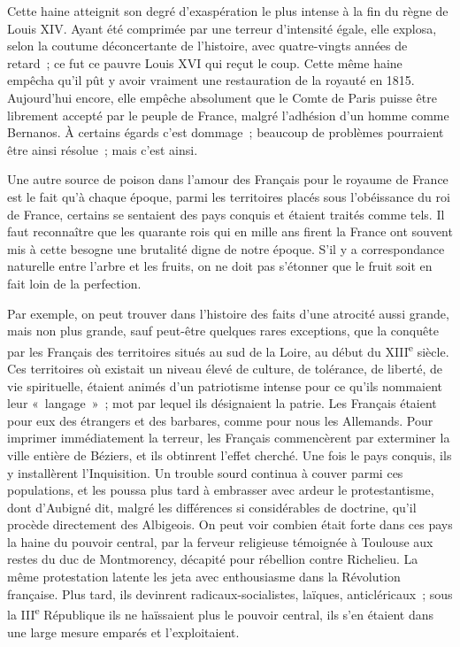 \documentclass[french,twoside]{book} %
\begin{document}
Cette haine atteignit son degré d'exaspération le plus intense à la fin du règne de Louis XIV. Ayant été comprimée par une terreur d'intensité égale, elle explosa, selon la coutume déconcertante de l'histoire, avec quatre-vingts années de retard ; ce fut ce pauvre Louis XVI qui reçut le coup. Cette même haine empêcha qu'il pût y avoir vraiment une restauration de la royauté en 1815. Aujourd'hui encore, elle empêche absolument que le Comte de Paris puisse être librement accepté par le peuple de France, malgré l'adhésion d'un homme comme Bernanos. À certains égards c'est dommage ; beaucoup de problèmes pourraient être ainsi résolue ; mais c'est ainsi.\par
Une autre source de poison dans l'amour des Français pour le royaume de France est le fait qu'à chaque époque, parmi les territoires placés sous l'obéissance du roi de France, certains se sentaient des pays conquis et étaient traités comme tels. Il faut reconnaître que les quarante rois qui en mille ans firent la France ont souvent mis à cette besogne une brutalité digne de notre époque. S'il y a correspondance naturelle entre l'arbre et les fruits, on ne doit pas s'étonner que le fruit soit en fait loin de la perfection.\par
Par exemple, on peut trouver dans l'histoire des faits d'une atrocité aussi grande, mais non plus grande, sauf peut-être quelques rares exceptions, que la conquête par les Français des territoires situés au sud de la Loire, au début du XIII\textsuperscript{e} siècle. Ces territoires où existait un niveau élevé de culture, de tolérance, de liberté, de vie spirituelle, étaient animés d'un patriotisme intense pour ce qu'ils nommaient leur « langage » ; mot par lequel ils désignaient la patrie. Les Français étaient pour eux des étrangers et des barbares, comme pour nous les Allemands. Pour imprimer immédiatement la terreur, les Français commencèrent par exterminer la ville entière de Béziers, et ils obtinrent l'effet cherché. Une fois le pays conquis, ils y installèrent l'Inquisition. Un trouble sourd continua à couver parmi ces populations, et les poussa plus tard à embrasser avec ardeur le protestantisme, dont d'Aubigné dit, malgré les différences si considérables de doctrine, qu'il procède directement des Albigeois. On peut voir combien était forte dans ces pays la haine du pouvoir central, par la ferveur religieuse témoignée à Toulouse aux restes du duc de Montmorency, décapité pour rébellion contre Richelieu. La même protestation latente les jeta avec enthousiasme dans la Révolution française. Plus tard, ils devinrent radicaux-socialistes, laïques, anticléricaux ; sous la III\textsuperscript{e} République ils ne haïssaient plus le pouvoir central, ils s'en étaient dans une large mesure emparés et l'exploitaient.\par
\end{document}
